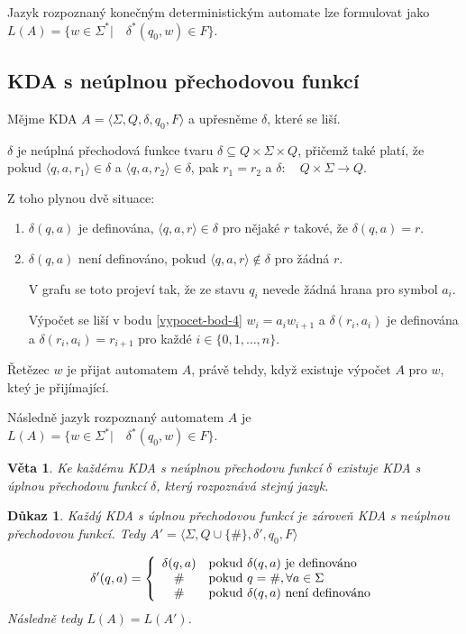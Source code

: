 \documentclass[10pt, a4paper, titlepage]{article}
\theoremstyle{note}
\newtheorem{dukaz}{Důkaz}
\newtheorem{veta}{Věta}
\begin{document}
Jazyk rozpoznaný konečným deterministickým automate lze formulovat jako
$L(A) = \lbrace w \in \Sigma^* |\quad \delta^*(q_0,w) \in F \rbrace$.

\subsection{KDA s neúplnou přechodovou funkcí}

Mějme KDA $A = \langle \Sigma, Q, \delta, q_0, F \rangle$ a upřesněme $\delta$, které se liší.

$\delta$ je neúplná přechodová funkce tvaru $\delta \subseteq Q \times \Sigma \times Q$, přičemž také platí, že
pokud $\langle q, a, r_1 \rangle \in \delta$ a $\langle q,a,r_2 \rangle \in \delta$, pak $r_1 = r_2$ a $\delta:\quad Q \times \Sigma \rightarrow Q$.

Z toho plynou dvě situace:
\begin{enumerate}
\item
$\delta(q, a)$ je definována, $\langle q,a,r \rangle \in \delta$ pro nějaké $r$ takové, že $\delta(q,a) = r$.

\item
$\delta(q,a)$ není definováno, pokud $\langle q, a, r \rangle \notin \delta$ pro žádná $r$.

V grafu se toto projeví tak, že ze stavu $q_i$ nevede žádná hrana pro symbol $a_i$.

Výpočet se liší v bodu \ref{vypocet-bod-4} $w_i = a_i w_{i+1}$ a $\delta(r_i, a_i)$ je definována a $\delta(r_i,a_i) = r_{i+1}$
pro každé $i \in \lbrace 0,1,\ldots,n \rbrace$.
\end{enumerate}

Řetězec $w$ je přijat automatem $A$, právě tehdy, když existuje výpočet $A$ pro $w$, kteý je přijímající.

Následně jazyk rozpoznaný automatem $A$ je $L(A) = \lbrace w \in \Sigma^*| \quad \delta^*(q_0,w) \in F \rbrace$.

\begin{veta}
Ke každému KDA s neúplnou přechodovu funkcí $\delta$ existuje KDA s úplnou přechodovu funkcí $\delta$, který rozpoznává stejný jazyk.
\end{veta}

\begin{dukaz}
Každý KDA s úplnou přechodovou funkcí je zároveň KDA s neúplnou přechodovou funkcí. Tedy
$A' = \langle \Sigma, Q \cup \lbrace \# \rbrace, \delta', q_0, F \rangle$

\begin{gather*}
\delta'(q,a) = \left\lbrace
\begin{array}{c l}
\delta(q,a) & \text{pokud } \delta(q,a) \text{ je definováno} \\
\# & \text{pokud } q = \#, \forall a \in \Sigma \\
\# & \text{pokud } \delta(q,a) \text{ není definováno}
\end{array}
\right. \\
\end{gather*}
Následně tedy $L(A) = L(A')$.
\end{dukaz}
\end{document}
